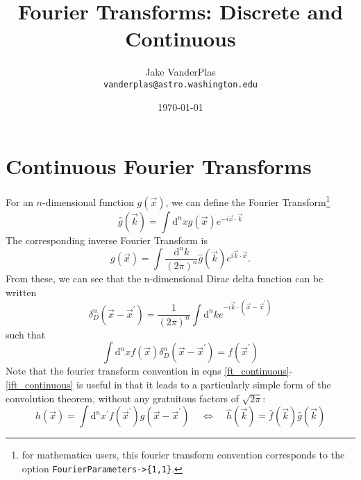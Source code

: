 \documentclass[12pt,preprint]{aastex}			%
\title{Fourier Transforms: Discrete and Continuous}	%
\author{Jake VanderPlas\\
  \texttt{vanderplas@astro.washington.edu}}
\date{\today}				%
\newcommand{\dd}{\mathrm{d}} %
\begin{document}
\section{Continuous Fourier Transforms}
For an $n$-dimensional function $g(\vec x)$, we can define the Fourier 
Transform\footnote{for mathematica users, this fourier transform
convention corresponds to the option \texttt{FourierParameters->\{1,1\}}.}
\begin{equation}
  \label{ft_continuous}
  \hat{g}(\vec k) = \int \dd^nx g(\vec x)e^{-i\vec x\cdot\vec k}
\end{equation}
The corresponding inverse Fourier Transform is
\begin{equation}
  \label{ift_continuous}
  g(\vec x) = \int \frac{\dd^nk}{(2\pi)^n} \hat{g}(\vec k)
  e^{i\vec k\cdot\vec x}.
\end{equation}
From these, we can see that the n-dimensional Dirac delta 
function can be written
\begin{equation}
  \label{ddelta_form}
  \delta^n_D(\vec x-\vec x^\prime) 
  = \frac{1}{(2\pi)^n}\int \dd^nke^{-i\vec k\cdot(\vec x-\vec x^\prime)}
\end{equation}
such that 
\begin{equation}
  \label{ddelta_def}
  \int \dd^nx f(\vec x)\delta^n_D(\vec x-\vec x^\prime) = f(\vec x^\prime)
\end{equation}
Note that the fourier transform convention in eqns 
\ref{ft_continuous}-\ref{ift_continuous}
is useful in that it leads to a particularly simple form of the 
convolution theorem, without any gratuitous factors of $\sqrt{2\pi}$:
\begin{equation}
  h(\vec x) = \int\dd^nx^\prime 
  f(\vec x^\prime)g(\vec x-\vec x^\prime)
  \ \ \ \ \ \Longleftrightarrow\ \ \ \ \ 
  \hat h(\vec k) = \hat f(\vec k)\hat g(\vec k)
\end{equation}
\end{document}
